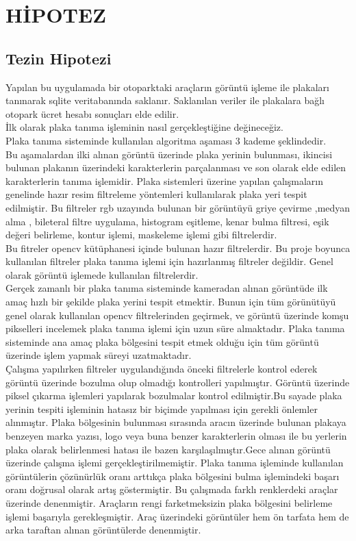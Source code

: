 \chapter{HİPOTEZ}\label{CH2}
\section{Tezin Hipotezi}
Yapılan bu uygulamada bir otoparktaki araçların görüntü işleme ile plakaları tanınarak sqlite veritabanında saklanır. Saklanılan veriler ile plakalara bağlı otopark ücret hesabı sonuçları elde edilir.\\
\cite{platereg} İlk olarak plaka tanıma işleminin nasıl gerçekleştiğine değineceğiz.\\
Plaka tanıma sisteminde kullanılan algoritma aşaması 3 kademe şeklindedir.\\
Bu aşamalardan ilki alınan görüntü üzerinde plaka yerinin  bulunması, ikincisi bulunan plakanın üzerindeki karakterlerin parçalanması ve son olarak elde edilen karakterlerin tanıma işlemidir. Plaka sistemleri üzerine yapılan çalışmaların genelinde hazır resim filtreleme yöntemleri kullanılarak plaka yeri tespit edilmiştir. \cite{filtreleme} Bu filtreler rgb uzayında bulunan bir görüntüyü griye çevirme ,medyan alma , bileteral filtre uygulama, histogram eşitleme, kenar bulma filtresi, eşik değeri belirleme, kontur işlemi, maskeleme işlemi gibi filtrelerdir.\\
Bu fitreler opencv kütüphanesi içinde bulunan hazır filtrelerdir. Bu proje boyunca kullanılan filtreler plaka tanıma işlemi için hazırlanmış filtreler değildir. Genel olarak görüntü işlemede kullanılan filtrelerdir.\\
\cite{video_proc} Gerçek zamanlı bir plaka tanıma sisteminde kameradan alınan görüntüde ilk amaç hızlı bir şekilde plaka yerini tespit etmektir. Bunun için tüm görünütüyü genel olarak kullanılan opencv filtrelerinden geçirmek, ve görüntü üzerinde komşu pikselleri incelemek plaka tanıma işlemi için uzun süre almaktadır. Plaka tanıma sisteminde ana amaç plaka bölgesini tespit etmek olduğu için tüm görüntü üzerinde işlem yapmak süreyi uzatmaktadır.\\
Çalışma yapılırken filtreler uygulandığında önceki filtrelerle kontrol ederek görüntü üzerinde bozulma olup olmadığı kontrolleri yapılmıştır. Görüntü üzerinde piksel çıkarma işlemleri yapılarak bozulmalar kontrol edilmiştir.Bu sayade plaka yerinin tespiti işleminin hatasız bir biçimde yapılması için gerekli önlemler alınmıştır. \cite{image_proc} Plaka bölgesinin bulunması sırasında aracın üzerinde bulunan plakaya benzeyen marka yazısı, logo veya buna benzer karakterlerin olması ile bu yerlerin plaka olarak belirlenmesi hatası ile bazen karşılaşılmıştır.Gece alınan görüntü üzerinde çalışma işlemi gerçekleştirilmemiştir. Plaka tanıma işleminde kullanılan görüntülerin çözünürlük oranı arttıkça plaka bölgesini bulma işlemindeki başarı oranı doğrusal olarak artış göstermiştir. Bu çalışmada farklı renklerdeki araçlar üzerinde denenmiştir. Araçların rengi farketmeksizin plaka bölgesini belirleme işlemi başarıyla gerekleşmiştir. Araç üzerindeki görüntüler hem ön tarfata hem de arka taraftan alınan görüntülerde denenmiştir.\\
